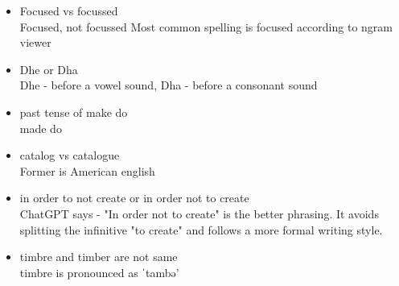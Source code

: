 \documentclass{../template/texnote}
\begin{document}
\begin{itemize}
 \item Focused vs focussed \\
Focused, not focussed
Most common spelling is focused according to ngram viewer

\item Dhe or Dha \\
Dhe - before a vowel sound, Dha - before a consonant sound

\item past tense of make do \\
made do

\item catalog vs catalogue \\
Former is American english

\item in order to not create
 or
 in order not to create \\
 ChatGPT says - 
"In order not to create" is the better phrasing. It avoids splitting the infinitive "to create" and follows a more formal writing style.

\item timbre and timber are not same \\
timbre is pronounced as ˈtambə'
	\end{itemize}
    \printbibliography
\end{document}

